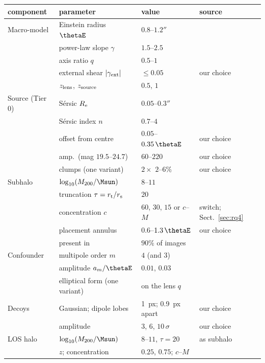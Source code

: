 \begin{tabular}{@{}llll@{}}
\toprule
component & parameter & value & source \\
\midrule
Macro-model & Einstein radius $\thetaE$ & $0.8$--$1.2''$ & \citet{tsang2024} \\
 & power-law slope $\gamma$ & $1.5$--$2.5$ & \citet{tsang2024} \\
 & axis ratio $q$ & $0.5$--$1$ & \citet{tsang2024} \\
 & external shear $|\gamma_{\rm ext}|$ & $\le0.05$ & our choice \\
 & $z_{\rm lens}$, $z_{\rm source}$ & $0.5$, $1$ & \citet{ostdiek2020} \\
\addlinespace[2pt]
Source (Tier 0) & S\'ersic $R_{\rm e}$ & $0.05$--$0.3''$ & \citet{ostdiek2020} \\
 & S\'ersic index $n$ & $0.7$--$4$ & \citet{ostdiek2020} \\
 & offset from centre & $0.05$--$0.35\,\thetaE$ & our choice \\
 & amp.\ (mag $19.5$--$24.7$) & $60$--$220$ & our choice \\
 & clumps (one variant) & $2\times$ $2$--$6\%$ & our choice \\
\addlinespace[2pt]
Subhalo & $\log_{10}(M_{200}/\Msun)$ & $8$--$11$ & \citet{tsang2024} \\
 & truncation $\tau=r_{\rm t}/r_{\rm s}$ & $20$ & \citet{tsang2024} \\
 & concentration $c$ & $60$, $30$, $15$ or $c$--$M$ & switch; Sect.~\ref{sec:rq4} \\
 & placement annulus & $0.6$--$1.3\,\thetaE$ & our choice \\
 & present in & $90\%$ of images & \citet{tsang2024} \\
\addlinespace[2pt]
Confounder & multipole order $m$ & $4$ (and $3$) & \citet{oriordan2025} \\
 & amplitude $a_m/\thetaE$ & $0.01$, $0.03$ & \citet{oriordan2025} \\
 & elliptical form (one variant) & on the lens $q$ & \citet{paugnat2025} \\
\addlinespace[2pt]
Decoys & Gaussian; dipole lobes & 1~px; 0.9~px apart & our choice \\
 & amplitude & $3$, $6$, $10\,\sigma$ & our choice \\
\addlinespace[2pt]
LOS halo & $\log_{10}(M_{200}/\Msun)$ & $8$--$11$, $\tau=20$ & as subhalo \\
 & $z$; concentration & $0.25$, $0.75$; $c$--$M$ & \citet{dutton2014} \\

\end{tabular}
